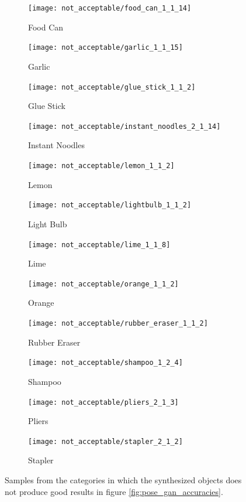 \begin{figure}[h!]
	\centering
	\begin{subfigure}{0.32\textwidth}
		\texttt{[image: not\_acceptable/food\_can\_1\_1\_14]}
		\caption{Food Can}
	\end{subfigure}
	\begin{subfigure}{0.32\textwidth}
		\texttt{[image: not\_acceptable/garlic\_1\_1\_15]}
		\caption{Garlic}
	\end{subfigure}
	\begin{subfigure}{0.32\textwidth}
		\texttt{[image: not\_acceptable/glue\_stick\_1\_1\_2]}
		\caption{Glue Stick}
	\end{subfigure}
	\begin{subfigure}{0.32\textwidth}
		\texttt{[image: not\_acceptable/instant\_noodles\_2\_1\_14]}
		\caption{Instant Noodles}
	\end{subfigure}
	\begin{subfigure}{0.32\textwidth}
		\texttt{[image: not\_acceptable/lemon\_1\_1\_2]}
		\caption{Lemon}
	\end{subfigure}
	\begin{subfigure}{0.32\textwidth}
		\texttt{[image: not\_acceptable/lightbulb\_1\_1\_2]}
		\caption{Light Bulb}
	\end{subfigure}
	\begin{subfigure}{0.32\textwidth}
		\texttt{[image: not\_acceptable/lime\_1\_1\_8]}
		\caption{Lime}
	\end{subfigure}
	\begin{subfigure}{0.32\textwidth}
		\texttt{[image: not\_acceptable/orange\_1\_1\_2]}
		\caption{Orange}
	\end{subfigure}
	\begin{subfigure}{0.32\textwidth}
		\texttt{[image: not\_acceptable/rubber\_eraser\_1\_1\_2]}
		\caption{Rubber Eraser}
	\end{subfigure}
	\begin{subfigure}{0.32\textwidth}
		\texttt{[image: not\_acceptable/shampoo\_1\_2\_4]}
		\caption{Shampoo}
	\end{subfigure}
	\begin{subfigure}{0.32\textwidth}
		\texttt{[image: not\_acceptable/pliers\_2\_1\_3]}
		\caption{Pliers}
	\end{subfigure}
	\begin{subfigure}{0.32\textwidth}
		\texttt{[image: not\_acceptable/stapler\_2\_1\_2]}
		\caption{Stapler}
	\end{subfigure}
	
	\caption{Samples from the categories in which the synthesized objects does not produce
		good results in figure \ref{fig:pose_gan_accuracies}.}
	\label{fig:not_acceptable}
\end{figure}

